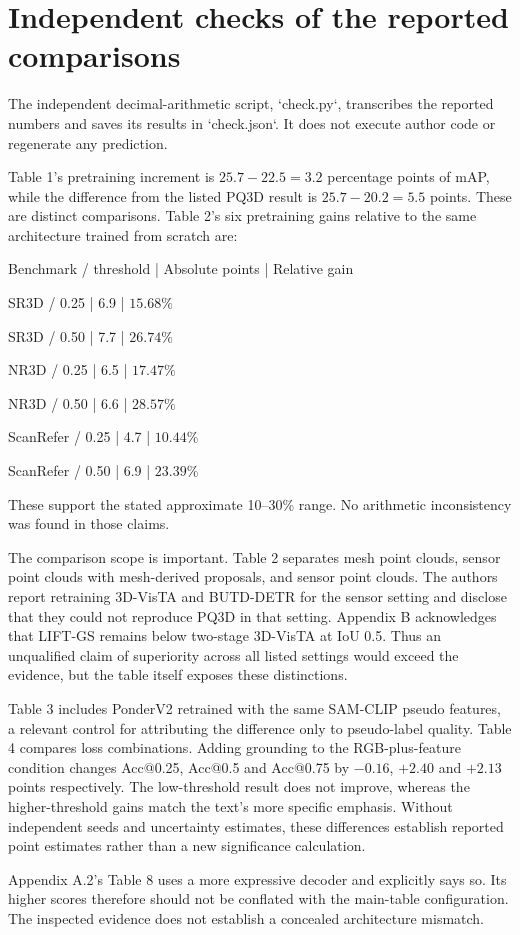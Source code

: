 \documentclass[10pt]{article}
\begin{document}
\section*{Independent checks of the reported comparisons}
The independent decimal-arithmetic script, `check.py`, transcribes the reported numbers and saves its results in `check.json`. It does not execute author code or regenerate any prediction.\par
Table 1’s pretraining increment is \(25.7-22.5=3.2\) percentage points of mAP, while the difference from the listed PQ3D result is \(25.7-20.2=5.5\) points. These are distinct comparisons. Table 2’s six pretraining gains relative to the same architecture trained from scratch are:\par
Benchmark / threshold | Absolute points | Relative gain\par
SR3D / 0.25 | 6.9 | \(15.68\%\)\par
SR3D / 0.50 | 7.7 | \(26.74\%\)\par
NR3D / 0.25 | 6.5 | \(17.47\%\)\par
NR3D / 0.50 | 6.6 | \(28.57\%\)\par
ScanRefer / 0.25 | 4.7 | \(10.44\%\)\par
ScanRefer / 0.50 | 6.9 | \(23.39\%\)\par
These support the stated approximate 10–30\% range. No arithmetic inconsistency was found in those claims.\par
The comparison scope is important. Table 2 separates mesh point clouds, sensor point clouds with mesh-derived proposals, and sensor point clouds. The authors report retraining 3D-VisTA and BUTD-DETR for the sensor setting and disclose that they could not reproduce PQ3D in that setting. Appendix B acknowledges that LIFT-GS remains below two-stage 3D-VisTA at IoU 0.5. Thus an unqualified claim of superiority across all listed settings would exceed the evidence, but the table itself exposes these distinctions.\par
Table 3 includes PonderV2 retrained with the same SAM-CLIP pseudo features, a relevant control for attributing the difference only to pseudo-label quality. Table 4 compares loss combinations. Adding grounding to the RGB-plus-feature condition changes Acc@0.25, Acc@0.5 and Acc@0.75 by \(-0.16\), \(+2.40\) and \(+2.13\) points respectively. The low-threshold result does not improve, whereas the higher-threshold gains match the text’s more specific emphasis. Without independent seeds and uncertainty estimates, these differences establish reported point estimates rather than a new significance calculation.\par
Appendix A.2’s Table 8 uses a more expressive decoder and explicitly says so. Its higher scores therefore should not be conflated with the main-table configuration. The inspected evidence does not establish a concealed architecture mismatch.\par
\end{document}
